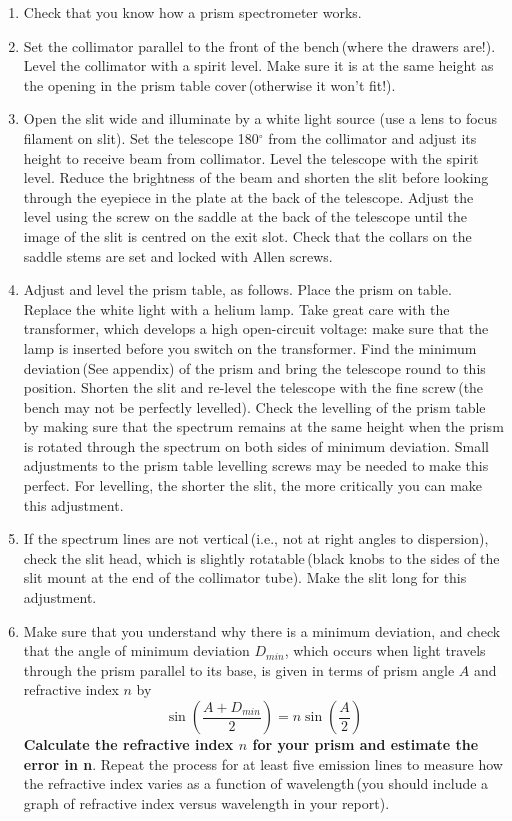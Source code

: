 \documentclass[12pt]{article}
\begin{document}
\begin{enumerate}
\item Check that you know how a prism spectrometer works.

\item Set the collimator parallel to the front of the bench\,(where the drawers are!). Level the collimator with a spirit level. Make sure it is at the same height as the opening in the prism table cover\,(otherwise it won't fit!).

\item Open the slit wide and illuminate by a white light source (use a lens to focus filament on slit). Set the telescope 180$^\circ$ from the collimator and adjust its height to receive beam from  collimator. Level the telescope with the spirit level. Reduce the brightness of the beam and shorten the slit before looking through the eyepiece in the plate at the back of the telescope. Adjust the level using the screw on the saddle at the back of the telescope until the image of the slit is centred on the exit slot. Check that the collars on the saddle stems are set and locked with Allen screws.

\item Adjust and level the prism table, as follows.  Place the prism on table. Replace the white light with a helium lamp. Take great care with the transformer, which develops a high open-circuit voltage: make sure that the lamp is inserted before you switch on the transformer. Find the minimum deviation\,(See appendix) of the prism and bring the telescope round to this position. Shorten the slit and re-level the telescope with the fine screw\,(the bench may not be perfectly levelled). Check the levelling of the prism table  by making sure that the spectrum remains at the same height  when the prism is rotated through the spectrum on both sides of minimum deviation. Small  adjustments to the prism table levelling screws may be needed to make this perfect. For levelling, the shorter the slit, the more critically you can make this adjustment.

\item If the spectrum lines are not vertical\,(i.e., not at right angles to dispersion), check the slit head, which is slightly rotatable\,(black knobs to the sides of the slit mount at the end of the collimator tube). Make the slit long for this adjustment.

\item Make sure that you understand why there is a minimum deviation, and check that the angle of minimum deviation $D_{min}$, which occurs when light travels through the prism parallel to its base, is given in terms of prism angle $A$ and refractive index $n$ by \[  \sin \left( \frac{A+D_{min}}{2} \right) = n \sin \left( \frac{A}{2} \right)   \] {\bf Calculate the refractive index $n$ for your prism and estimate the error in n}. Repeat the process for at least five emission lines to measure how the refractive index varies as a function of wavelength\,(you should include a graph of refractive index versus wavelength in your report).
\end{enumerate}
\end{document}
